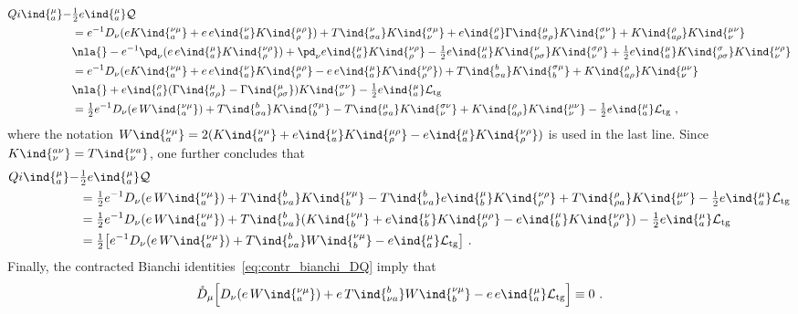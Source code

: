 \documentclass[11pt]{article}
\begin{document}
\begin{align*}
	Qi\ind{^\mu_a} - &\tfrac{1}{2} e\ind{_a^\mu} \mathcal{Q}
	\\
	&= e^{-1} D_\nu( e K\ind{^{\nu\mu}_a} + e\, e\ind{_a^\nu} 
	K\ind{^{\mu\rho}_\rho} ) +  T\ind{^\nu_{\sigma a}}	
	K\ind{^{\sigma\mu}_\nu} + e\ind{_a^\rho} 
	\Gamma\ind{^\mu_{\sigma\rho}} K\ind{^{\sigma\nu}_\nu} + 
	K\ind{^\rho_{a\rho}} K\ind{^{\mu\nu}_\nu} \\
	&\nla{}- e^{-1} \pd_\nu( e\, e\ind{_a^\mu} 
	K\ind{^{\nu\rho}_\rho} ) + \pd_\nu e\ind{_a^\mu} 
	K\ind{^{\nu\rho}_\rho} - \tfrac{1}{2} e\ind{_a^\mu} 
	K\ind{^\nu_{\rho\sigma}} K\ind{^{\sigma\rho}_\nu} + 
	\tfrac{1}{2} e\ind{_a^\mu}	K\ind{^\sigma_{\rho \sigma}} 
	K\ind{^{\nu\rho}_\nu}
	\\
	&= e^{-1} D_\nu( e K\ind{^{\nu\mu}_a} + e\, e\ind{_a^\nu} 
	K\ind{^{\mu\rho}_\rho} - e\, e\ind{_a^\mu} 
	K\ind{^{\nu\rho}_\rho} ) +  T\ind{^b_{\sigma a}}	
	K\ind{^{\sigma\mu}_b} + K\ind{^\rho_{a\rho}} 
	K\ind{^{\mu\nu}_\nu} \\
	&\nla{}+ e\ind{_a^\rho}( \Gamma\ind{^\mu_{\sigma\rho}} - 
	\Gamma\ind{^\mu_{\rho\sigma}} ) K\ind{^{\sigma\nu}_\nu} - 
	\tfrac{1}{2} e\ind{_a^\mu} \mathcal{L}_\mathrm{tg} \\
	&= \tfrac{1}{2} e^{-1} D_\nu (e\, W\ind{_a^{\nu\mu}} )
	+ T\ind{^b_{\sigma a}} K\ind{^{\sigma\mu}_b} - 
	T\ind{^\mu_{\sigma a}} K\ind{^{\sigma\nu}_\nu} + 
	K\ind{^\rho_{a\rho}} K\ind{^{\mu\nu}_\nu} - \tfrac{1}{2} 
	e\ind{_a^\mu} \mathcal{L}_\mathrm{tg}~,
\end{align*}
where the notation $W\ind{_a^{\nu\mu}} = 2( K\ind{^{\nu\mu}_a} + 
e\ind{_a^\nu} K\ind{^{\mu\rho}_\rho} - e\ind{_a^\mu} 
K\ind{^{\nu\rho}_\rho} )$ is used in the last line. Since 
$K\ind{^{a\nu}_\nu} = T\ind{^{\nu a}_\nu}$, one further concludes 
that
\begin{align*}
	Qi\ind{^\mu_a} - &\tfrac{1}{2} e\ind{_a^\mu} \mathcal{Q}
	\\
	&= \tfrac{1}{2} e^{-1} D_\nu (e\, W\ind{_a^{\nu\mu}} ) + 
	T\ind{^b_{\nu a}} K\ind{^{\nu\mu}_b} - T\ind{^b_{\nu a}} 
	e\ind{_b^\mu} K\ind{^{\nu\rho}_\rho} + T\ind{^\rho_{\rho a}} 
	K\ind{^{\mu\nu}_\nu} - \tfrac{1}{2} e\ind{_a^\mu} 
	\mathcal{L}_\mathrm{tg}
	\\
	&= \tfrac{1}{2} e^{-1} D_\nu (e\, W\ind{_a^{\nu\mu}} ) + 
	T\ind{^b_{\nu a}} ( K\ind{^{\nu\mu}_b} + e\ind{_b^\nu} 
	K\ind{^{\mu\rho}_\rho} - e\ind{_b^\mu} K\ind{^{\nu\rho}_\rho} 
	) - \tfrac{1}{2} e\ind{_a^\mu} \mathcal{L}_\mathrm{tg}
	\\
	&= \tfrac{1}{2} \big[ e^{-1} D_\nu (e\, W\ind{_a^{\nu\mu}} ) + 
	T\ind{^b_{\nu a}} W\ind{_b^{\nu\mu}} -
	e\ind{_a^\mu} \mathcal{L}_\mathrm{tg} \big]~.
\end{align*}
Finally, the contracted Bianchi 
identities~\eqref{eq:contr_bianchi_DQ} imply that
\begin{equation}
	\mathring{D}_\mu \Big[ D_\nu (e\, W\ind{_a^{\nu\mu}} ) + e\, 
	T\ind{^b_{\nu a}} W\ind{_b^{\nu\mu}} - e\, e\ind{_a^\mu} 
	\mathcal{L}_\mathrm{tg} \Big] \equiv 0~.
\end{equation}

%
%
%
\end{document}
